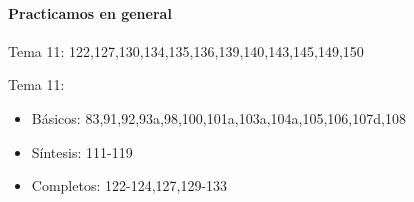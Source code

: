 


\paragraph{Practicamos en general}
Tema 11: 
122,127,130,134,135,136,139,140,143,145,149,150

Tema 11:
\begin{itemize}
  \item Básicos: 83,91,92,93a,98,100,101a,103a,104a,105,106,107d,108
  \item Síntesis: 111-119
  \item Completos: 122-124,127,129-133
\end{itemize}



